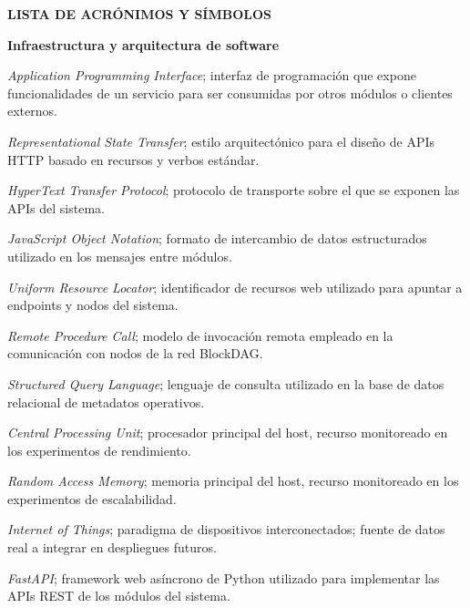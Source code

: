 \noindent
\textbf{\large LISTA DE ACRÓNIMOS Y SÍMBOLOS}

\vspace{1cm}

\noindent\textbf{Infraestructura y arquitectura de software}

\vspace{0.3cm}

\begin{description}[leftmargin=3cm, style=sameline, font=\normalfont]
  \item[API]     \textit{Application Programming Interface}; interfaz de programación que
                 expone funcionalidades de un servicio para ser consumidas por otros módulos
                 o clientes externos.
  \item[REST]    \textit{Representational State Transfer}; estilo arquitectónico para el
                 diseño de APIs HTTP basado en recursos y verbos estándar.
  \item[HTTP]    \textit{HyperText Transfer Protocol}; protocolo de transporte
                 sobre el que se exponen las APIs del sistema.
  \item[JSON]    \textit{JavaScript Object Notation}; formato de intercambio de datos
                 estructurados utilizado en los mensajes entre módulos.
  \item[URL]     \textit{Uniform Resource Locator}; identificador de recursos web utilizado
                 para apuntar a endpoints y nodos del sistema.
  \item[RPC]     \textit{Remote Procedure Call}; modelo de invocación remota empleado en la
                 comunicación con nodos de la red BlockDAG.
  \item[SQL]     \textit{Structured Query Language}; lenguaje de consulta utilizado en la
                 base de datos relacional de metadatos operativos.
  \item[CPU]     \textit{Central Processing Unit}; procesador principal del host, recurso
                 monitoreado en los experimentos de rendimiento.
  \item[RAM]     \textit{Random Access Memory}; memoria principal del host, recurso
                 monitoreado en los experimentos de escalabilidad.
  \item[IoT]     \textit{Internet of Things}; paradigma de dispositivos interconectados;
                 fuente de datos real a integrar en despliegues futuros.
  \item[FastAPI] \textit{FastAPI}; framework web asíncrono de Python utilizado para
                 implementar las APIs REST de los módulos del sistema.
\end{description}

